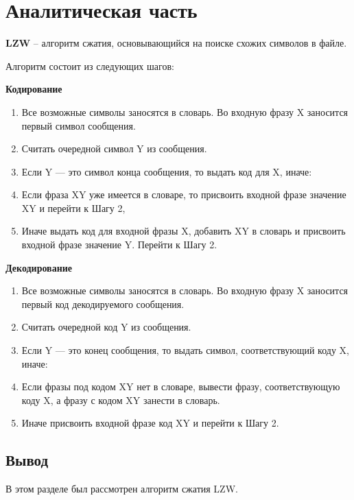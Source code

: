 \chapter{Аналитическая часть}


\textbf{LZW} -- алгоритм сжатия, основывающийся на поиске схожих символов в файле.

Алгоритм состоит из следующих шагов:

\textbf{Кодирование}

\begin{enumerate}
	\item  Все возможные символы заносятся в словарь. Во входную фразу X
	заносится первый символ сообщения.
	\item Считать очередной символ Y
	из сообщения.
	\item Если Y --- это символ конца сообщения, то выдать код для X, иначе:
	\item Если фраза XY уже имеется в словаре, то присвоить входной фразе значение XY и перейти к Шагу 2,
	\item Иначе выдать код для входной фразы X, добавить XY в словарь и присвоить входной фразе значение Y. Перейти к Шагу 2.
\end{enumerate}

\textbf{Декодирование}

\begin{enumerate}
	\item Все возможные символы заносятся в словарь. Во входную фразу X
	заносится первый код декодируемого сообщения.
	\item Считать очередной код Y из сообщения.
	\item Если Y --- это конец сообщения, то выдать символ, соответствующий коду X, иначе:
	\item Если фразы под кодом XY нет в словаре, вывести фразу, соответствующую коду X, а фразу с кодом XY занести в словарь.
	\item Иначе присвоить входной фразе код XY и перейти к Шагу 2.
\end{enumerate}


\section*{Вывод} 

В этом разделе был рассмотрен алгоритм сжатия LZW.
